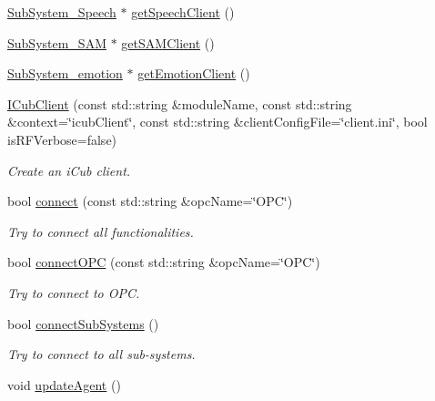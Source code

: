 \begin{DoxyCompactItemize}
\item 
\hyperlink{group__icubclient__subsystems_classicubclient_1_1SubSystem__Speech}{Sub\+System\+\_\+\+Speech} $\ast$ \hyperlink{group__icubclient__clients_ab0c540ef27084c3845c4bf102808bb83}{get\+Speech\+Client} ()
\item 
\hyperlink{group__icubclient__subsystems_classicubclient_1_1SubSystem__SAM}{Sub\+System\+\_\+\+S\+AM} $\ast$ \hyperlink{group__icubclient__clients_ae255d014e106fbbae51f56e670093610}{get\+S\+A\+M\+Client} ()
\item 
\hyperlink{group__icubclient__subsystems_classicubclient_1_1SubSystem__emotion}{Sub\+System\+\_\+emotion} $\ast$ \hyperlink{group__icubclient__clients_afbb986e5685fe8d66784217a6f6b0230}{get\+Emotion\+Client} ()
\item 
\hyperlink{group__icubclient__clients_a50ca757de4db9723eaf872791a8c20c8}{I\+Cub\+Client} (const std\+::string \&module\+Name, const std\+::string \&context=\char`\"{}icub\+Client\char`\"{}, const std\+::string \&client\+Config\+File=\char`\"{}client.\+ini\char`\"{}, bool is\+R\+F\+Verbose=false)
\begin{DoxyCompactList}\small\item\em Create an i\+Cub client. \end{DoxyCompactList}\item 
bool \hyperlink{group__icubclient__clients_a3909d8199400ef12033f10c070a026a3}{connect} (const std\+::string \&opc\+Name=\char`\"{}O\+PC\char`\"{})
\begin{DoxyCompactList}\small\item\em Try to connect all functionalities. \end{DoxyCompactList}\item 
bool \hyperlink{group__icubclient__clients_a62aa694a2b631e84f922188ad44ba7eb}{connect\+O\+PC} (const std\+::string \&opc\+Name=\char`\"{}O\+PC\char`\"{})
\begin{DoxyCompactList}\small\item\em Try to connect to O\+PC. \end{DoxyCompactList}\item 
bool \hyperlink{group__icubclient__clients_a7cb4ce150f6033c93d68380ab50106db}{connect\+Sub\+Systems} ()
\begin{DoxyCompactList}\small\item\em Try to connect to all sub-\/systems. \end{DoxyCompactList}\item 
void \hyperlink{group__icubclient__clients_a965d41811ec54d656fa58222ac1b13de}{update\+Agent} ()

\end{DoxyCompactItemize}
